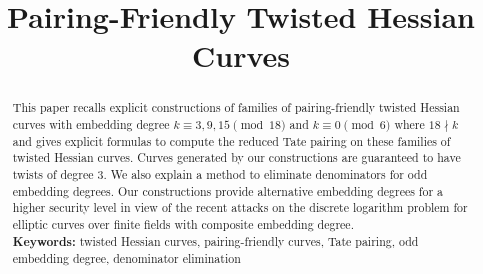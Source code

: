 \documentclass[11pt, a4paper]{llncs}
\newif\ifpublic
\begin{document}
\title{Pairing-Friendly Twisted Hessian Curves}


\ifpublic
\author{
Chitchanok Chuengsatiansup\inst{1}
\and
Chloe Martindale\inst{2}
}
\authorrunning{Chuengsatiansup, Martindale}

\institute{
ENS de Lyon and INRIA \\
46 All\'{e}e d'Italie 69364 Lyon Cedex 07, France \\
\email{chitchanok.chuengsatiansup@ens-lyon.fr}
\and
Department of Mathematics and Computer Science\\
Technische Universiteit Eindhoven\\
P.O. Box 513, 5600 MB Eindhoven, The Netherlands\\
\email{c.r.martindale@tue.nl}
}
\fi


\date{}
\maketitle
\begin{abstract}
This paper recalls explicit constructions of families of pairing-friendly twisted Hessian curves
with embedding degree $k \equiv 3,9,15 \pmod{18}$ and $k \equiv 0 \pmod{6}$ where $18 \nmid k$
and gives explicit formulas to compute the reduced Tate pairing on these families of twisted Hessian curves.
Curves generated by our constructions are guaranteed to have twists of degree 3.
We also explain a method to eliminate denominators for odd embedding degrees.
Our constructions provide alternative embedding degrees for a higher security level
in view of the recent attacks on the discrete logarithm problem for elliptic curves over finite fields with composite embedding degree.
\\[10pt]
\textbf{Keywords:}
twisted Hessian curves, pairing-friendly curves, Tate pairing, odd embedding degree, denominator elimination
\end{abstract}








%




\end{document}
